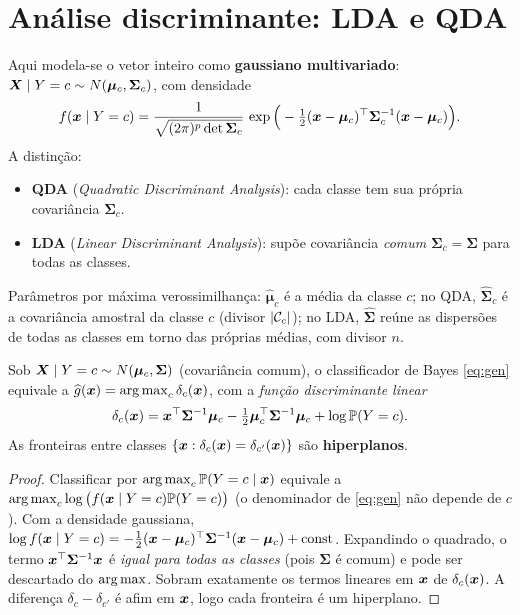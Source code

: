 \documentclass[11pt,a4paper]{article}
\begin{document}
\section{Análise discriminante: LDA e QDA}
Aqui modela-se o vetor inteiro como \textbf{gaussiano multivariado}:
$\bm{X}\mid Y=c \sim N(\bm{\mu}_c,\bm{\Sigma}_c)$, com densidade
\[
  f(\bm{x}\mid Y=c) = \frac{1}{\sqrt{(2\pi)^p\det\bm{\Sigma}_c}}\,
  \exp\Big(-\tfrac12(\bm{x}-\bm{\mu}_c)^\top\bm{\Sigma}_c^{-1}(\bm{x}-\bm{\mu}_c)\Big).
\]
A distinção:
\begin{itemize}[leftmargin=1.4cm,nosep]
  \item \textbf{QDA} (\emph{Quadratic Discriminant Analysis}): cada classe tem sua
        própria covariância $\bm{\Sigma}_c$.
  \item \textbf{LDA} (\emph{Linear Discriminant Analysis}): supõe covariância
        \emph{comum} $\bm{\Sigma}_c=\bm{\Sigma}$ para todas as classes.
\end{itemize}
Parâmetros por máxima verossimilhança: $\widehat{\bm\mu}_c$ é a média da classe $c$;
no QDA, $\widehat{\bm\Sigma}_c$ é a covariância amostral da classe $c$ (divisor
$\left\lvert \mathcal{C}_c \right\rvert$); no LDA, $\widehat{\bm\Sigma}$ reúne as dispersões de todas as
classes em torno das próprias médias, com divisor $n$.

\begin{proposicao}\label{prop:lda}
Sob $\bm{X}\mid Y=c\sim N(\bm{\mu}_c,\bm{\Sigma})$ (covariância comum), o classificador
de Bayes \eqref{eq:gen} equivale a $\ghat(\x)=\argmax_c \delta_c(\x)$, com a
\emph{função discriminante linear}
\[
  \delta_c(\bm{x}) = \bm{x}^\top\bm{\Sigma}^{-1}\bm{\mu}_c
   - \tfrac12\bm{\mu}_c^\top\bm{\Sigma}^{-1}\bm{\mu}_c + \log\mathbb{P}(Y=c).
\]
As fronteiras entre classes $\{\bm{x}:\delta_c(\bm{x})=\delta_{c'}(\bm{x})\}$ são
\textbf{hiperplanos}.
\end{proposicao}
\begin{proof}
Classificar por $\argmax_c \Prob(Y=c\mid\x)$ equivale a $\argmax_c \log\big(f(\x\mid
Y=c)\Prob(Y=c)\big)$ (o denominador de \eqref{eq:gen} não depende de $c$). Com a
densidade gaussiana,
$\log f(\bm{x}\mid Y=c)=-\tfrac12(\bm{x}-\bm{\mu}_c)^\top\bm{\Sigma}^{-1}(\bm{x}-\bm{\mu}_c)
+\text{const}$. Expandindo o quadrado, o termo $\bm{x}^\top\bm{\Sigma}^{-1}\bm{x}$ é
\emph{igual para todas as classes} (pois $\bm{\Sigma}$ é comum) e pode ser
descartado do $\argmax$. Sobram exatamente os termos lineares em $\bm{x}$ de
$\delta_c(\bm{x})$. A diferença $\delta_c-\delta_{c'}$ é afim em $\bm{x}$, logo cada
fronteira é um hiperplano.
\end{proof}
\end{document}
